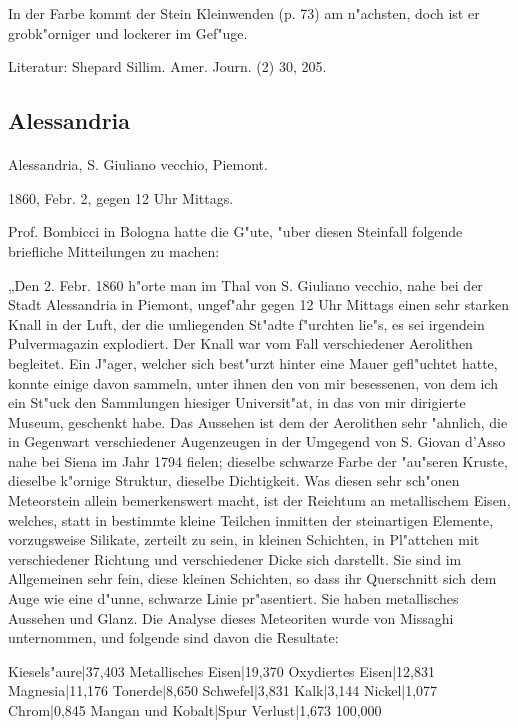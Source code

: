 \documentclass[a4paper, 11pt, oneside]{article}
\begin{document}
In der Farbe kommt der Stein Kleinwenden (p. 73) am n"achsten, doch ist er grobk"orniger und lockerer im Gef"uge.

Literatur: Shepard Sillim. Amer. Journ. (2) 30, 205.

\subsection{Alessandria}
\normalsize
\paragraph{}
Alessandria, S. Giuliano vecchio, Piemont.

1860, Febr. 2, gegen 12 Uhr Mittags.

Prof. Bombicci in Bologna hatte die G"ute, "uber diesen Steinfall folgende briefliche Mitteilungen zu machen:

„Den 2. Febr. 1860 h"orte man im Thal von S. Giuliano vecchio, nahe bei der Stadt Alessandria in Piemont, ungef"ahr gegen 12 Uhr Mittags einen sehr starken Knall in der Luft, der die umliegenden St"adte f"urchten lie"s, es sei irgendein Pulvermagazin explodiert. Der Knall war vom Fall verschiedener Aerolithen begleitet. Ein J"ager, welcher sich best"urzt hinter eine Mauer gefl"uchtet hatte, konnte einige davon sammeln, unter ihnen den von mir besessenen, von dem ich ein St"uck den Sammlungen hiesiger Universit"at, in das von mir dirigierte Museum, geschenkt habe. Das Aussehen ist dem der Aerolithen sehr "ahnlich, die in Gegenwart verschiedener Augenzeugen in der Umgegend von S. Giovan d'Asso nahe bei Siena im Jahr 1794 fielen; dieselbe schwarze Farbe der "au"seren Kruste, dieselbe k"ornige Struktur, dieselbe Dichtigkeit. Was diesen sehr sch"onen Meteorstein allein bemerkenswert macht, ist der Reichtum an metallischem Eisen, welches, statt in bestimmte kleine Teilchen inmitten der steinartigen Elemente, vorzugsweise Silikate, zerteilt zu sein, in kleinen Schichten, in Pl"attchen mit verschiedener Richtung und verschiedener Dicke sich darstellt. Sie sind im Allgemeinen sehr fein, diese kleinen Schichten, so dass ihr Querschnitt sich dem Auge wie eine d"unne, schwarze Linie pr"asentiert. Sie haben metallisches Aussehen und Glanz. Die Analyse dieses Meteoriten wurde von Missaghi unternommen, und folgende sind davon die Resultate:

Kiesels"aure|37,403  
Metallisches Eisen|19,370  
Oxydiertes Eisen|12,831  
Magnesia|11,176  
Tonerde|8,650  
Schwefel|3,831  
Kalk|3,144  
Nickel|1,077  
Chrom|0,845  
Mangan und Kobalt|Spur  
Verlust|1,673  
100,000
\end{document}
